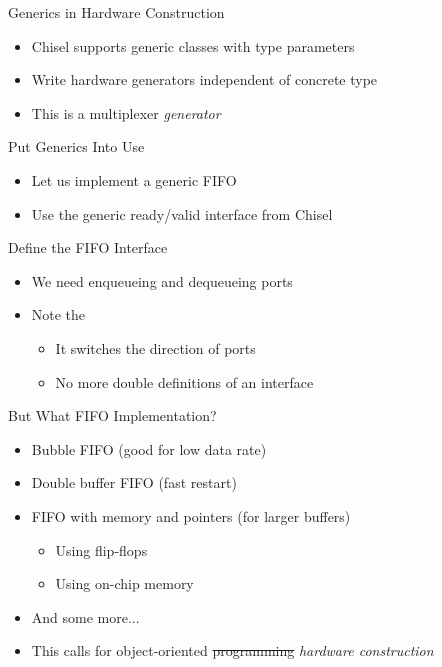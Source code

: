\begin{frame}[fragile]{Generics in Hardware Construction}
\begin{itemize}
\item Chisel supports generic classes with type parameters
\item Write hardware generators independent of concrete type
\item This is a multiplexer \emph{generator}
\end{itemize}
\end{frame}

\begin{frame}[fragile]{Put Generics Into Use}
\begin{itemize}
\item Let us implement a generic FIFO
\item Use the generic ready/valid interface from Chisel
\end{itemize}
\end{frame}

\begin{frame}[fragile]{Define the FIFO Interface}
\begin{itemize}
\item We need enqueueing and dequeueing ports
\item Note the 
\begin{itemize}
\item It switches the direction of ports
\item No more double definitions of an interface
\end{itemize}
\end{itemize}
\end{frame}

\begin{frame}[fragile]{But What FIFO Implementation?}
\begin{itemize}
\item Bubble FIFO (good for low data rate)
\item Double buffer FIFO (fast restart)
\item FIFO with memory and pointers (for larger buffers)
\begin{itemize}
\item Using flip-flops
\item Using on-chip memory
\end{itemize}
\item And some more...
\end{itemize}
\begin{itemize}
\item This calls for object-oriented \sout{programming} \emph{hardware construction}
\end{itemize}
\end{frame}


